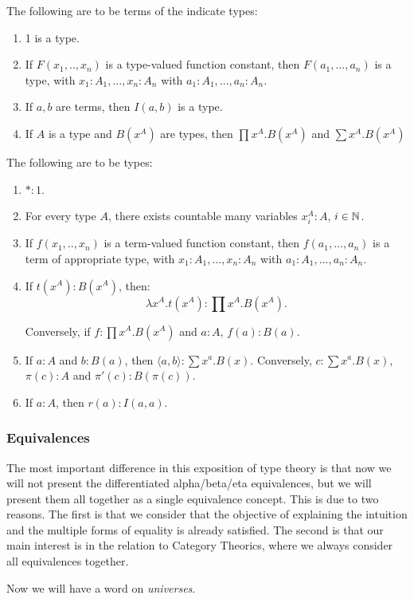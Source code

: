 \begin{definition}
  The following are to be terms of the indicate types:
  \begin{enumerate}
  \item 1 is a type.
  \item If $F(x_1,..,x_n)$ is a type-valued function constant, then $F(a_1,...,a_n)$ is a type, with  $x_1:A_1,...,x_n:A_n$ with $a_1:A_1,...,a_n:A_n$.
  \item If $a,b$ are terms, then $I(a,b)$ is a type.
  \item If $A$ is a type and $B(x^A)$ are types, then $\prod x^A. B(x^A)$ and  $\sum x^A. B(x^A)$
    
  \end{enumerate}
\end{definition}

\begin{definition}
  The following are to be types:
  \begin{enumerate}
  \item $*:1$.
  \item For every type $A$, there exists countable many variables $x_i^A : A$, $i\in \mathbb{N}$.
  \item If $f(x_1,..,x_n)$ is a term-valued function constant, then $f(a_1,...,a_n)$ is a term of appropriate type, with  $x_1:A_1,...,x_n:A_n$ with $a_1:A_1,...,a_n:A_n$.
  \item If $t(x^A) : B(x^A)$, then:
    $$\lambda x^A.t(x^A) : \prod x^A. B(x^A).$$

    Conversely, if $f : \prod x^A. B(x^A)$ and $a:A$, $f(a) : B(a)$.
  \item If $a:A$ and $b:B(a)$, then $\langle a, b\rangle : \sum x^a. B(x)$. Conversely, $c : \sum x^a. B(x)$, $\pi (c) : A$ and $\pi'(c) : B(\pi(c))$. 
  \item If $a:A$, then $r(a): I(a,a)$. 
  \end{enumerate}
\end{definition}





\subsubsection{Equivalences}

The most important difference in this exposition of type theory is that now we will not present the differentiated alpha/beta/eta equivalences, but we will present them all together as a single equivalence concept. This is due to two reasons. The first is that we consider that the objective of explaining the intuition and the multiple forms of equality is already satisfied. The second is that our main interest is in the relation to Category Theorics, where we always consider all equivalences together.


\begin{definition}

\end{definition}


Now we will have a word on \emph{universes}. 